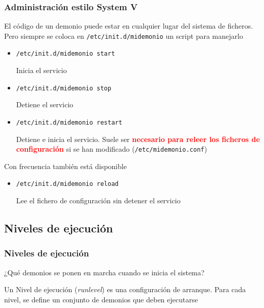 \documentclass[ucs]{beamer}
\begin{document}
\begin{frame}[fragile]
\frametitle{Administración estilo System V}
El código de un demonio puede estar en cualquier lugar
del sistema de ficheros.
Pero siempre se coloca en \verb|/etc/init.d/midemonio| un script
para manejarlo

\begin{itemize}	
\item
\verb|/etc/init.d/midemonio start|

Inicia el servicio
\item
\verb|/etc/init.d/midemonio stop|

Detiene el servicio
\item 
\verb|/etc/init.d/midemonio restart|

Detiene e inicia el servicio. Suele ser 
\textbf{\textcolor{red}{necesario para releer los ficheros de configuración}}
si se han modificado (\verb|/etc/midemonio.conf|)


\end{itemize}

Con frecuencia también está disponible
\begin{itemize}	
\item
\verb|/etc/init.d/midemonio reload|

Lee el fichero de configuración sin detener el servicio
\end{itemize}
\end{frame}

\subsection{Niveles de ejecución}

\begin{frame}[fragile]
\frametitle{Niveles de ejecución}


¿Qué demonios se ponen en marcha cuando se inicia el sistema?



Un Nivel de ejecución (\emph{runlevel}) es una configuración de arranque.
Para cada nivel, se define un conjunto de demonios que deben ejecutarse


\end{frame}
\end{document}
